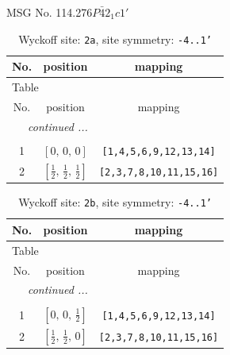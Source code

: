 \documentclass[fleqn,8pt]{jsarticle}
\begin{document}
\setcounter{MaxMatrixCols}{32}

\renewcommand{\tablename}{Table~}
\renewcommand{\figurename}{Figure~}
\begin{center}
\LARGE
MSG No. 114.276\quad$P\bar{4}2_{1}c1'$
\end{center}
\renewcommand{\arraystretch}{1.2}
\begin{longtable}{ccc}
\caption{Wyckoff site: {\tt 2a}, site symmetry: {\tt -4..1'}}
 \\
 \hline \hline
No. & position & mapping \\ \hline \endfirsthead

\multicolumn{2}{l}{\tablename\ \thetable{}} \\
 \hline \hline
No. & position & mapping \\ \hline \endhead

 \hline \hline
\multicolumn{2}{r}{\footnotesize\it continued ...} \\ \endfoot

 \hline \hline
\multicolumn{2}{r}{} \\ \endlastfoot

1 & $\left[ 0,\, 0,\, 0 \right]$ & {\tt [1,4,5,6,9,12,13,14]} \\ \hline
2 & $\left[ \frac{1}{2},\, \frac{1}{2},\, \frac{1}{2} \right]$ & {\tt [2,3,7,8,10,11,15,16]} \\
\end{longtable}
\renewcommand{\arraystretch}{1.2}
\begin{longtable}{ccc}
\caption{Wyckoff site: {\tt 2b}, site symmetry: {\tt -4..1'}}
 \\
 \hline \hline
No. & position & mapping \\ \hline \endfirsthead

\multicolumn{2}{l}{\tablename\ \thetable{}} \\
 \hline \hline
No. & position & mapping \\ \hline \endhead

 \hline \hline
\multicolumn{2}{r}{\footnotesize\it continued ...} \\ \endfoot

 \hline \hline
\multicolumn{2}{r}{} \\ \endlastfoot

1 & $\left[ 0,\, 0,\, \frac{1}{2} \right]$ & {\tt [1,4,5,6,9,12,13,14]} \\ \hline
2 & $\left[ \frac{1}{2},\, \frac{1}{2},\, 0 \right]$ & {\tt [2,3,7,8,10,11,15,16]} \\
\end{longtable}
\end{document}
